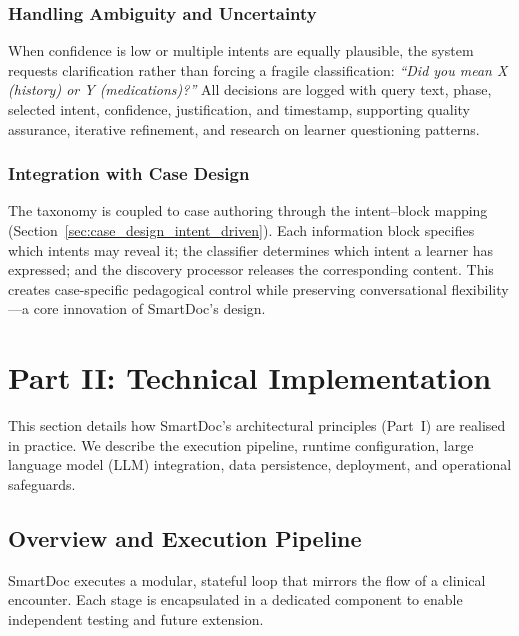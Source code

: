 \subsubsection{Handling Ambiguity and Uncertainty}

When confidence is low or multiple intents are equally plausible, the system
requests clarification rather than forcing a fragile classification:
\emph{``Did you mean X (history) or Y (medications)?''}
All decisions are logged with query text, phase, selected intent, confidence,
justification, and timestamp, supporting quality assurance, iterative refinement,
and research on learner questioning patterns.

\subsubsection{Integration with Case Design}

The taxonomy is coupled to case authoring through the intent–block mapping
(Section~\ref{sec:case_design_intent_driven}). Each information block specifies
which intents may reveal it; the classifier determines which intent a learner
has expressed; and the discovery processor releases the corresponding content.
This creates case-specific pedagogical control while preserving conversational
flexibility—a core innovation of SmartDoc’s design.

\section{Part II: Technical Implementation}
\label{sec:tech_impl}

This section details how SmartDoc’s architectural principles (Part~I) are realised
in practice. We describe the execution pipeline, runtime configuration, large language
model (LLM) integration, data persistence, deployment, and operational safeguards.

\subsection{Overview and Execution Pipeline}
\label{sec:pipeline_overview}

SmartDoc executes a modular, stateful loop that mirrors the flow of a clinical
encounter. Each stage is encapsulated in a dedicated component to enable independent
testing and future extension.

